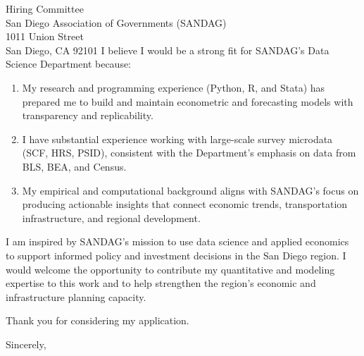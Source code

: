 \documentclass[11pt,letterpaper]{letter}
\begin{document}
\begin{letter}{Hiring Committee \\
San Diego Association of Governments (SANDAG) \\
1011 Union Street \\
San Diego, CA 92101}
I believe I would be a strong fit for SANDAG’s Data Science Department because:
\begin{enumerate}
    \item My research and programming experience (Python, R, and Stata) has prepared me to build and maintain econometric and forecasting models with transparency and replicability.
    \item I have substantial experience working with large-scale survey microdata (SCF, HRS, PSID), consistent with the Department’s emphasis on data from BLS, BEA, and Census.
    \item My empirical and computational background aligns with SANDAG’s focus on producing actionable insights that connect economic trends, transportation infrastructure, and regional development.
\end{enumerate}

I am inspired by SANDAG’s mission to use data science and applied economics to support informed policy and investment decisions in the San Diego region. I would welcome the opportunity to contribute my quantitative and modeling expertise to this work and to help strengthen the region’s economic and infrastructure planning capacity.

Thank you for considering my application.

\closing{Sincerely,}

\end{letter}
\end{document}
